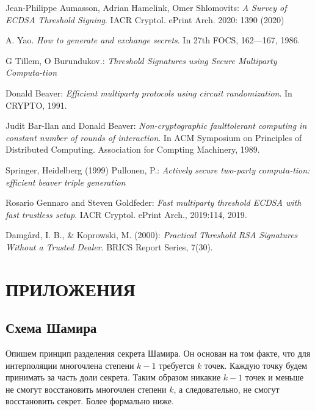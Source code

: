 \documentclass[a4paper,12pt]{article}
\theoremstyle{definition}
\begin{document}
	\newpage
	\renewcommand{\refname}{БИБЛИОГРАФИЧЕСКИЙ СПИСОК}
	\begin{thebibliography}{9}
		Jean-Philippe Aumasson, Adrian Hamelink, Omer Shlomovits: \textit{A Survey of ECDSA Threshold Signing}. IACR Cryptol. ePrint Arch. 2020: 1390 (2020) 
		
		A. Yao. \textit{How to generate and exchange secrets}. In 27th FOCS, 162—167, 1986.
	
		G Tillem, O Burundukov.: \textit{Threshold Signatures using Secure Multiparty Computa-tion}
		
		Donald Beaver: \textit{Efficient multiparty protocols using circuit randomization}. In CRYPTO, 1991.
		
		Judit Bar-Ilan and Donald Beaver: \textit{Non-cryptographic faulttolerant computing in constant number of rounds of interaction}. In ACM Symposium on Principles of Distributed Computing. Association for Compting Machinery, 1989. 
		
		Springer, Heidelberg (1999) Pullonen, P.: \textit{Actively secure two-party computa-tion: efficient beaver triple generation}
		
		Rosario Gennaro and Steven Goldfeder: \textit{Fast multiparty threshold ECDSA with fast trustless setup}. IACR Cryptol. ePrint Arch., 2019:114, 2019.
		
		Damgård, I. B., \& Koprowski, M. (2000): \textit{Practical Threshold RSA Signatures Without a Trusted Dealer}. BRICS Report Series, 7(30).
		
	\end{thebibliography}
	
	\newpage
	\section*{ПРИЛОЖЕНИЯ}
	
	\setcounter{subsection}{0}
	\renewcommand\thesubsection{\Alph{subsection}}

		\subsection{Схема Шамира} \label{applic:Shamir}
		
		Опишем принцип разделения секрета Шамира. Он основан на том факте, что для интерполяции многочлена степени $k-1$ требуется $k$ точек. Каждую точку будем принимать за часть доли секрета. Таким образом никакие $k-1$ точек и меньше не смогут восстановить многочлен степени $k$, а следовательно, не смогут восстановить секрет. Более формально ниже.
		
\end{document}
